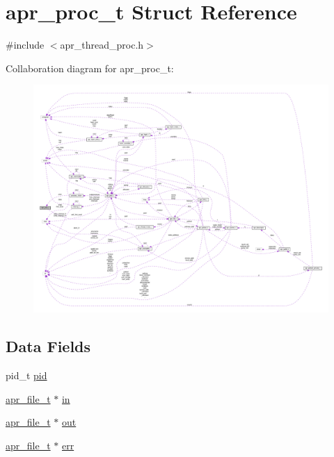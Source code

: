 \hypertarget{structapr__proc__t}{}\section{apr\+\_\+proc\+\_\+t Struct Reference}
\label{structapr__proc__t}


{\ttfamily \#include $<$apr\+\_\+thread\+\_\+proc.\+h$>$}



Collaboration diagram for apr\+\_\+proc\+\_\+t\+:
\nopagebreak
\begin{figure}[H]
\begin{center}
\leavevmode
\includegraphics[width=350pt]{structapr__proc__t__coll__graph}
\end{center}
\end{figure}
\subsection*{Data Fields}
\begin{DoxyCompactItemize}
\item 
pid\+\_\+t \hyperlink{structapr__proc__t_a8a8ee4b234156485a72497023e7482e5}{pid}
\item 
\hyperlink{structapr__file__t}{apr\+\_\+file\+\_\+t} $\ast$ \hyperlink{structapr__proc__t_a914bda8939f9d17c9e2f238683fb994b}{in}
\item 
\hyperlink{structapr__file__t}{apr\+\_\+file\+\_\+t} $\ast$ \hyperlink{structapr__proc__t_acb7d7c5226217946d761f0e90ff70d24}{out}
\item 
\hyperlink{structapr__file__t}{apr\+\_\+file\+\_\+t} $\ast$ \hyperlink{structapr__proc__t_ad087f812b5c69ce937db4cf6e8cd5a0b}{err}
\end{DoxyCompactItemize}


